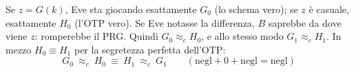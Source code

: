 Se \(z = G(k)\), Eve sta giocando esattamente \(G_0\) (lo schema vero); se \(z\) è casuale, esattamente \(H_0\) (l'OTP vero). Se Eve notasse la differenza, \(B\) saprebbe da dove viene \(z\): romperebbe il PRG. Quindi \(G_0 \approx_c H_0\), e allo stesso modo \(G_1 \approx_c H_1\). In mezzo \(H_0 \equiv H_1\) per la segretezza perfetta dell'OTP:
\[
G_0 \ \approx_c\ H_0 \ \equiv\ H_1 \ \approx_c\ G_1 \qquad (\text{negl} + 0 + \text{negl} = \text{negl})
\]
